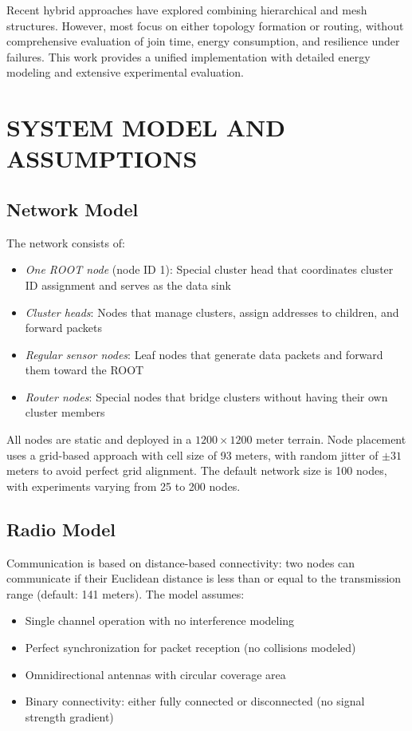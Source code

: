 \documentclass[conference]{IEEEtran}
\begin{document}
Recent hybrid approaches have explored combining hierarchical and mesh structures. However, most focus on either topology formation or routing, without comprehensive evaluation of join time, energy consumption, and resilience under failures. This work provides a unified implementation with detailed energy modeling and extensive experimental evaluation.

\section{SYSTEM MODEL AND ASSUMPTIONS}

\subsection{Network Model}
The network consists of:
\begin{itemize}
    \item \emph{One ROOT node} (node ID 1): Special cluster head that coordinates cluster ID assignment and serves as the data sink
    \item \emph{Cluster heads}: Nodes that manage clusters, assign addresses to children, and forward packets
    \item \emph{Regular sensor nodes}: Leaf nodes that generate data packets and forward them toward the ROOT
    \item \emph{Router nodes}: Special nodes that bridge clusters without having their own cluster members
\end{itemize}

All nodes are static and deployed in a $1200 \times 1200$ meter terrain. Node placement uses a grid-based approach with cell size of 93 meters, with random jitter of $\pm 31$ meters to avoid perfect grid alignment. The default network size is 100 nodes, with experiments varying from 25 to 200 nodes.

\subsection{Radio Model}
Communication is based on distance-based connectivity: two nodes can communicate if their Euclidean distance is less than or equal to the transmission range (default: 141 meters). The model assumes:
\begin{itemize}
    \item Single channel operation with no interference modeling
    \item Perfect synchronization for packet reception (no collisions modeled)
    \item Omnidirectional antennas with circular coverage area
    \item Binary connectivity: either fully connected or disconnected (no signal strength gradient)
\end{itemize}
\end{document}
